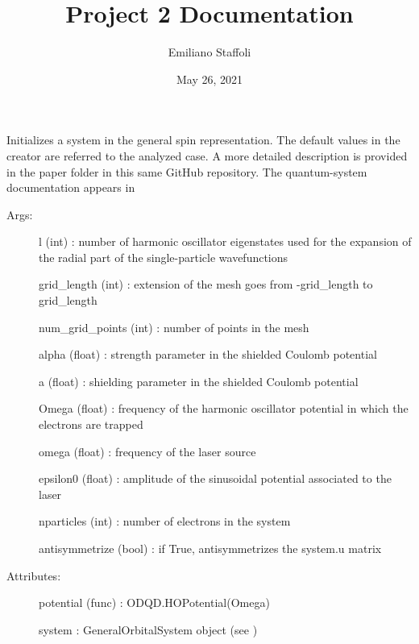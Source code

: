 \documentclass[letterpaper,10pt,english]{sphinxmanual}
\title{Project 2 Documentation}
\date{May 26, 2021}
\author{Emiliano Staffoli}
\begin{document}
\pagestyle{empty}
\sphinxmaketitle
\pagestyle{plain}
\sphinxtableofcontents
\pagestyle{normal}
\label{\detokenize{index::doc}}


\begin{fulllineitems}
\label{\detokenize{index:do.GHF}}
Initializes a system in the general spin representation. The default values in the creator are referred to the analyzed case.
A more detailed description is provided in the paper folder in this same GitHub repository.
The quantum-system documentation appears in 
\begin{description}
\item[{Args:}] \leavevmode
l (int) : number of harmonic oscillator eigenstates used for the expansion of the radial part of the single-particle wavefunctions

grid\_length (int) : extension of the mesh goes from -grid\_length to grid\_length

num\_grid\_points (int) : number of points in the mesh

alpha (float) : strength parameter in the shielded Coulomb potential

a (float) : shielding parameter in the shielded Coulomb potential

Omega (float) : frequency of the harmonic oscillator potential in which the electrons are trapped

omega (float) : frequency of the laser source

epsilon0 (float) : amplitude of the sinusoidal potential associated to the laser

nparticles (int) : number of electrons in the system

antisymmetrize (bool) : if True, antisymmetrizes the system.u matrix

\item[{Attributes:}] \leavevmode
potential (func) : ODQD.HOPotential(Omega)

system : GeneralOrbitalSystem object (see )


\end{description}
\end{fulllineitems}
\end{document}

